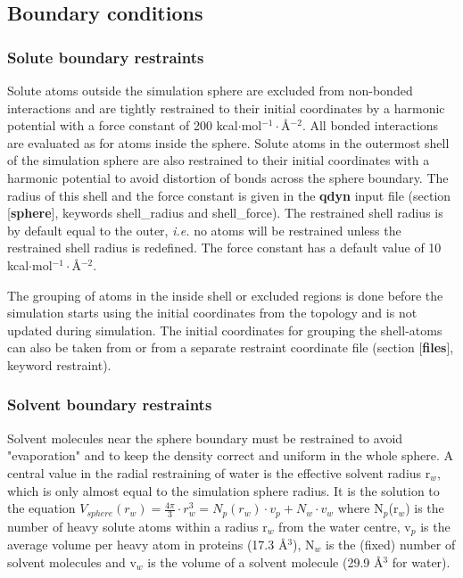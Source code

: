 \documentclass[a4paper,10pt]{article}
\begin{document}

\subsection{Boundary conditions}
\label{subsec:boundary}
\subsubsection{Solute boundary restraints}

\label{subsubsec:soluteboundary} Solute  atoms outside  the simulation
sphere  are  excluded from  non-bonded  interactions  and are  tightly
restrained to their initial coordinates by a harmonic potential with a
force constant  of 200 kcal$\cdot$mol$^{-1}\cdot$\AA$^{-2}$.  All bonded
interactions  are evaluated  as for  atoms inside  the sphere.  Solute
atoms  in  the outermost  shell  of  the  simulation sphere  are  also
restrained to their  initial coordinates with a  harmonic potential to
avoid distortion  of bonds across  the sphere boundary. The  radius of
this shell and the force constant  is given in the \textbf{qdyn} input
file   (section   [\textbf{sphere}],    keywords   shell\_radius   and
shell\_force). The restrained shell radius  is by default equal to the
outer, \emph{i.e.} no  atoms will be restrained  unless the restrained
shell radius is  redefined. The force constant has a  default value of
10 kcal$\cdot$mol$^{-1}\cdot$\AA$^{-2}$.

The grouping of atoms in the inside shell or excluded regions is
done before the simulation starts using the initial coordinates
from the topology and is not updated during simulation. The
initial coordinates for grouping the shell-atoms can also be taken
from or from a separate restraint coordinate file (section
[\textbf{files}], keyword restraint).

\subsubsection{Solvent boundary restraints}
\label{subsubsec:solventboundary}


Solvent molecules near the sphere boundary must be restrained to
avoid "evaporation" and to keep the density correct and uniform in
the whole sphere. A central value in the radial restraining of
water is the effective solvent radius r$_w$, which is only almost
equal to the simulation sphere radius. It is the solution to the
equation $V_{sphere} \left(r_w\right) = \frac{4\pi}{3}\cdot r_w^3
= N_p\left(r_w\right)\cdot v_p+N_w\cdot v_w $ where N$_p$(r$_w$)
is the number of heavy solute atoms within a radius r$_w$ from the
water centre, v$_p$ is the average volume per heavy atom in
proteins (17.3 \AA$^3$), N$_w$ is the (fixed) number of solvent
molecules and v$_w$ is the volume of a solvent molecule (29.9
\AA$^3$ for water).
\end{document}
